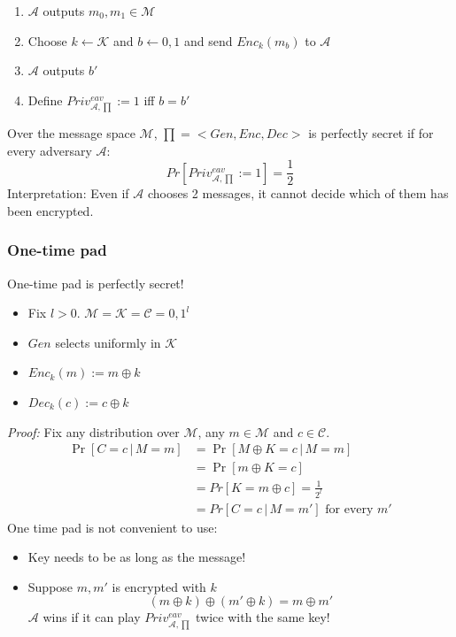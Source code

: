 \documentclass[11pt, oneside]{article}   	%
\begin{document}
\begin{enumerate}
\item $\mathcal{A}$ outputs $m_0,m_1 \in \mathcal{M}$
\item Choose $k \leftarrow \mathcal{K}$ and  $b \leftarrow {0,1}$ and send $Enc_k(m_b)$ to $\mathcal{A}$
 \item $\mathcal{A}$ outputs $b'$
 \item Define $Priv_{\mathcal{A},\prod}^{eav}:=1$ iff $b=b'$
\end{enumerate}

Over the message space $\mathcal{M}$, $\prod=<Gen,Enc,Dec>$ is perfectly secret if for every adversary $\mathcal{A}$:
\begin{equation}
Pr[Priv_{\mathcal{A},\prod}^{eav}:=1] = \frac{1}{2}
\end{equation}
Interpretation: Even if $\mathcal{A}$ chooses 2 messages, it cannot decide which of them has been encrypted.
\subsubsection{One-time pad}
One-time pad is perfectly secret!
\begin{itemize}
\item Fix $ l> 0$. $\mathcal{M}=\mathcal{K}=\mathcal{C}={0,1}^{l}$
\item $Gen$ selects uniformly in $\mathcal{K}$
\item $Enc_k(m) := m \oplus k$
\item $Dec_k(c) := c \oplus k$
\end{itemize}
\emph{Proof:} Fix any distribution over $\mathcal{M}$, any $m \in \mathcal{M}$ and $c \in \mathcal{C}$.
\begin{equation}
\begin{aligned}
    \Pr[ C=c \,|\,  M=m] &= \Pr[M \oplus K = c \, | \, M = m] \\
    &= \Pr[m \oplus K =c ]\\
    &= Pr[K=m\oplus c] = \frac{1}{2^l}\\
    &= Pr[C=c \,|\,M=m'] \text{ for every } m'
\end{aligned}
\end{equation}
One time pad is not convenient to use:
\begin{itemize}
\item Key needs to be as long as the message!
\item Suppose $m,m'$ is encrypted with $k$
\begin{equation}
(m\oplus k) \oplus (m'\oplus k) = m \oplus m'
\end{equation}
$\mathcal{A}$ wins if it can play $Priv_{\mathcal{A},\prod}^{eav}$ twice with the same key!
\end{itemize}
\end{document}
